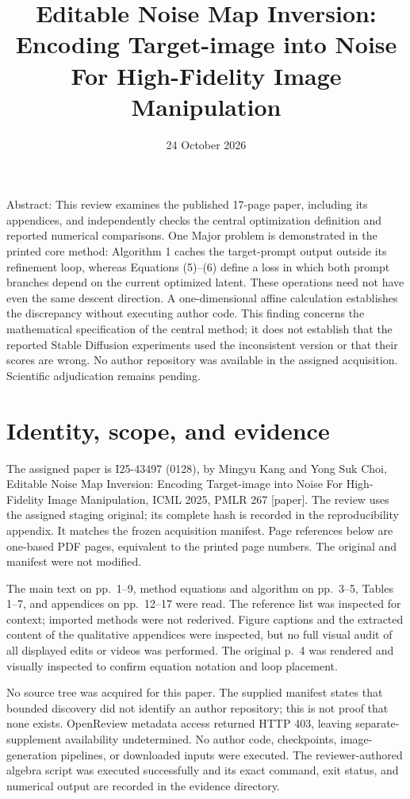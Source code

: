 \documentclass[10pt]{article}
\title{Editable Noise Map Inversion: Encoding Target-image into Noise For High-Fidelity Image Manipulation}
\author{}
\date{24 October 2026}
\begin{document}
\maketitle
Abstract: This review examines the published 17-page paper, including its appendices, and independently checks the central optimization definition and reported numerical comparisons. One Major problem is demonstrated in the printed core method: Algorithm 1 caches the target-prompt output outside its refinement loop, whereas Equations (5)–(6) define a loss in which both prompt branches depend on the current optimized latent. These operations need not have even the same descent direction. A one-dimensional affine calculation establishes the discrepancy without executing author code. This finding concerns the mathematical specification of the central method; it does not establish that the reported Stable Diffusion experiments used the inconsistent version or that their scores are wrong. No author repository was available in the assigned acquisition. Scientific adjudication remains pending.\par
\section*{Identity, scope, and evidence}
The assigned paper is I25-43497 (0128), by Mingyu Kang and Yong Suk Choi, Editable Noise Map Inversion: Encoding Target-image into Noise For High-Fidelity Image Manipulation, ICML 2025, PMLR 267 [paper]. The review uses the assigned staging original; its complete hash is recorded in the reproducibility appendix. It matches the frozen acquisition manifest. Page references below are one-based PDF pages, equivalent to the printed page numbers. The original and manifest were not modified.\par
The main text on pp. 1–9, method equations and algorithm on pp. 3–5, Tables 1–7, and appendices on pp. 12–17 were read. The reference list was inspected for context; imported methods were not rederived. Figure captions and the extracted content of the qualitative appendices were inspected, but no full visual audit of all displayed edits or videos was performed. The original p. 4 was rendered and visually inspected to confirm equation notation and loop placement.\par
No source tree was acquired for this paper. The supplied manifest states that bounded discovery did not identify an author repository; this is not proof that none exists. OpenReview metadata access returned HTTP 403, leaving separate-supplement availability undetermined. No author code, checkpoints, image-generation pipelines, or downloaded inputs were executed. The reviewer-authored algebra script was executed successfully and its exact command, exit status, and numerical output are recorded in the evidence directory.\par
\end{document}
